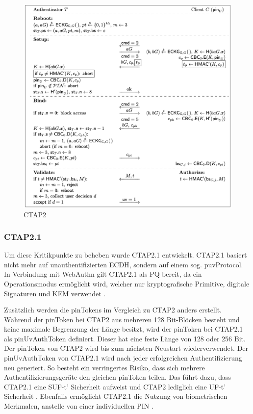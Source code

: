 \begin{figure}[H]
	\centering 
	\includegraphics[width=1\textwidth]{img/abbildungen/ctap2-process.png}
	\captionsetup{format=hang}
	\caption{CTAP2 \cite{bindel2022fido2}} \label{ctap2-process}
\end{figure}

\subsubsection*{CTAP2.1}
Um diese Kritikpunkte zu beheben wurde CTAP2.1 entwickelt. CTAP2.1 basiert nicht mehr auf unauthentifizierten \ac{ECDH}, sondern auf einem sog. \ac{puvProtocol}. In Verbindung mit WebAuthn gilt CTAP2.1 als \ac{PQ} bereit, da ein Operationsmodus ermöglicht wird, welcher nur kryptografische Primitive, digitale Signaturen und \ac{KEM} verwendet \cite{bindel2022fido2}.

Zusätzlich werden die pinTokens im Vergleich zu \ac{CTAP2} anders erstellt. Während der pinToken bei \ac{CTAP2} aus mehreren 128 Bit-Blöcken besteht und keine maximale Begrenzung der Länge besitzt, wird der pinToken bei CTAP2.1 als pinUvAuthToken definiert. Dieser hat eine feste Länge von 128 oder 256 Bit. Der pinToken von \ac{CTAP2} wird bis zum nächsten Neustart wiederverwendet. Der pinUvAuthToken von CTAP2.1 wird nach jeder erfolgreichen Authentifizierung neu generiert. So besteht ein verringertes Risiko, dass sich mehrere Authentifizierungsgeräte den gleichen pinToken teilen. Das führt dazu, dass CTAP2.1 eine \ac{SUF}-t' Sicherheit aufweist und \ac{CTAP2} lediglich eine \ac{UF}-t' Sicherheit \cite{bindel2022fido2}. Ebenfalls ermöglicht CTAP2.1 die Nutzung von biometrischen Merkmalen, anstelle von einer individuellen PIN \cite{bindel2022fido2}.


